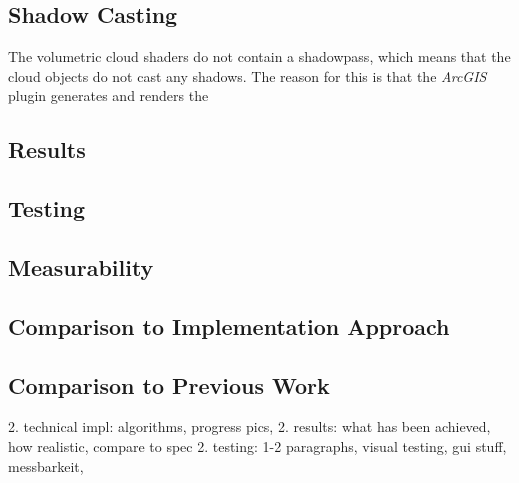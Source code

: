 \subsection{Shadow Casting}
\label{section:techimpl:shadow}
The \gls{volumetric} cloud \gls{shader}s do not contain a \gls{shadowpass}, which means that the cloud objects do not cast any shadows.
The reason for this is that the \emph{ArcGIS} plugin generates and renders the 

\subsection{Results}
\label{section:techimpl:results}

\subsection{Testing}
\label{section:techimpl:testing}

\subsection{Measurability}
\label{section:techimpl:measure}

\subsection{Comparison to Implementation Approach}
\label{section:techimpl:comparison_impl}

\subsection{Comparison to Previous Work}
\label{section:techimpl:comparison}

2. technical impl: algorithms, progress pics, 
2. results: what has been achieved, how realistic, compare to spec
2. testing: 1-2 paragraphs, visual testing, gui stuff, messbarkeit,
